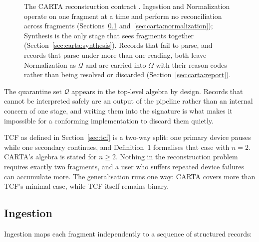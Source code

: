 \begin{figure}[htbp]
  \caption{The CARTA reconstruction contract \carta. Ingestion and
  Normalization operate on one fragment at a time and perform no
  reconciliation across fragments (Sections~\ref{sec:carta:ingestion}
  and~\ref{sec:carta:normalization}); Synthesis is the only stage that sees
  fragments together (Section~\ref{sec:carta:synthesis}). Records that fail to
  parse, and records that parse under more than one reading, both leave
  Normalization as $\mathcal{Q}$ and are carried into $\Omega$ with their
  reason codes rather than being resolved or discarded
  (Section~\ref{sec:carta:report}).}
  \label{fig:carta_pipeline}
\end{figure}

The quarantine set $\mathcal{Q}$ appears in the top-level algebra by design.
Records that cannot be interpreted safely are an output of the pipeline rather
than an internal concern of one stage, and writing them into the signature is
what makes it impossible for a conforming implementation to discard them quietly.

TCF as defined in Section~\ref{sec:tcf} is a two-way split: one primary device
pauses while one secondary continues, and Definition~1 formalises that case with
$n = 2$. CARTA's algebra is stated for $n \ge 2$. Nothing in the reconstruction
problem requires exactly two fragments, and a user who suffers repeated device
failures can accumulate more. The generalisation runs one way: CARTA covers more
than TCF's minimal case, while TCF itself remains binary.

\subsection{Ingestion}
\label{sec:carta:ingestion}

Ingestion maps each fragment independently to a sequence of structured records:

